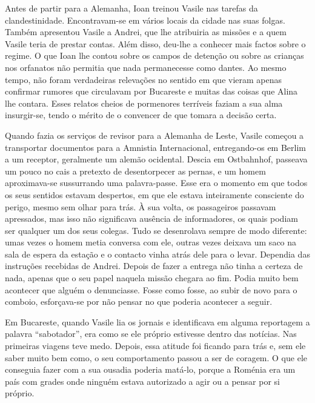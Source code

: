 Antes de partir para a Alemanha, Ioan treinou Vasile nas tarefas da
clandestinidade. Encontravam-se em vários locais da cidade nas suas
folgas. Também apresentou Vasile a Andrei, que lhe atribuiria as missões
e a quem Vasile teria de prestar contas. Além disso, deu-lhe a conhecer
mais factos sobre o regime. O que Ioan lhe contou sobre os campos de
detenção ou sobre as crianças nos orfanatos não permitia que nada
permanecesse como dantes. Ao mesmo tempo, não foram verdadeiras
relevações no sentido em que vieram apenas confirmar rumores que
circulavam por Bucareste e muitas das coisas que Alina lhe contara.
Esses relatos cheios de pormenores terríveis faziam a sua alma
insurgir-se, tendo o mérito de o convencer de que tomara a decisão
certa.

Quando fazia os serviços de revisor para a Alemanha
de Leste, Vasile começou a transportar documentos para a Amnistia
Internacional, entregando-os em Berlim a um receptor, geralmente um
alemão ocidental. Descia em Ostbahnhof, passeava um pouco no cais a
pretexto de desentorpecer as pernas, e um homem aproximava-se
sussurrando uma palavra-passe. Esse era o momento em
que todos os seus sentidos estavam despertos, em que ele estava
inteiramente consciente do perigo, mesmo sem olhar para trás. À sua
volta, os passageiros passavam apressados, mas isso não significava
ausência de informadores, os quais podiam ser qualquer um dos seus
colegas. Tudo se desenrolava sempre de modo diferente: umas vezes o
homem metia conversa com ele, outras vezes deixava um saco na sala de
espera da estação e o contacto vinha atrás dele para o levar. Dependia
das instruções recebidas de Andrei. Depois de fazer a entrega não tinha
a certeza de nada, apenas que o seu papel naquela missão chegara ao fim.
Podia muito bem acontecer que alguém o denunciasse. Fosse como fosse, ao
subir de novo para o comboio, esforçava-se por não pensar no que poderia
acontecer a seguir.

Em Bucareste, quando Vasile lia os jornais e identificava em alguma reportagem a palavra ``sabotador'', era como se ele próprio
estivesse dentro das notícias. Nas primeiras viagens teve medo. Depois,
essa atitude foi ficando para trás e, sem ele saber muito bem como, o
seu comportamento passou a ser de coragem. O que ele conseguia fazer
com a sua ousadia poderia matá-lo, porque a Roménia era um país com
grades onde ninguém estava autorizado a agir ou a pensar por si próprio.

